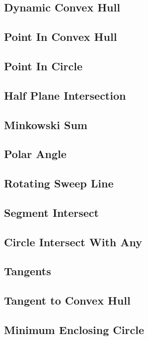 \subsection{Dynamic Convex Hull}

\subsection{Point In Convex Hull}

\subsection{Point In Circle}

\subsection{Half Plane Intersection}

\subsection{Minkowski Sum}

\subsection{Polar Angle}

\subsection{Rotating Sweep Line}

\subsection{Segment Intersect}

\subsection{Circle Intersect With Any}

\subsection{Tangents}

\subsection{Tangent to Convex Hull}

\subsection{Minimum Enclosing Circle}

